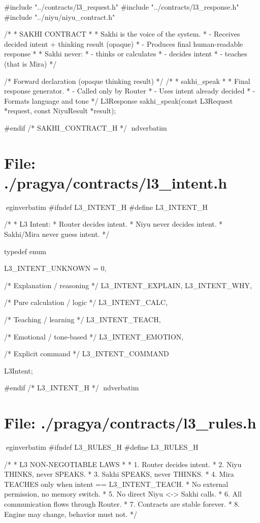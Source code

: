 \documentclass{article}
\begin{document}
#include "../contracts/l3_request.h"
#include "../contracts/l3_response.h"
#include "../niyu/niyu_contract.h"

/*
 * SAKHI CONTRACT
 *
 * Sakhi is the voice of the system.
 * - Receives decided intent + thinking result (opaque)
 * - Produces final human-readable response
 *
 * Sakhi never:
 * - thinks or calculates
 * - decides intent
 * - teaches (that is Mira)
 */

/* Forward declaration (opaque thinking result) */
/*
 * sakhi_speak
 *
 * Final response generator.
 * - Called only by Router
 * - Uses intent already decided
 * - Formats language and tone
 */
L3Response sakhi_speak(const L3Request *request,
                       const NiyuResult *result);

#endif /* SAKHI_CONTRACT_H */
nd{verbatim}
\section*{File: ./pragya/contracts/l3_intent.h}
egin{verbatim}
#ifndef L3_INTENT_H
#define L3_INTENT_H

/* 
 * L3 Intent:
 * Router decides intent.
 * Niyu never decides intent.
 * Sakhi/Mira never guess intent.
 */

typedef enum {
    L3_INTENT_UNKNOWN = 0,

    /* Explanation / reasoning */
    L3_INTENT_EXPLAIN,
    L3_INTENT_WHY,

    /* Pure calculation / logic */
    L3_INTENT_CALC,

    /* Teaching / learning */
    L3_INTENT_TEACH,

    /* Emotional / tone-based */
    L3_INTENT_EMOTION,

    /* Explicit command */
    L3_INTENT_COMMAND

} L3Intent;

#endif /* L3_INTENT_H */
nd{verbatim}
\section*{File: ./pragya/contracts/l3_rules.h}
egin{verbatim}
#ifndef L3_RULES_H
#define L3_RULES_H

/*
 * L3 NON-NEGOTIABLE LAWS
 *
 * 1. Router decides intent.
 * 2. Niyu THINKS, never SPEAKS.
 * 3. Sakhi SPEAKS, never THINKS.
 * 4. Mira TEACHES only when intent == L3_INTENT_TEACH.
 *    No external permission, no memory switch.
 * 5. No direct Niyu <-> Sakhi calls.
 * 6. All communication flows through Router.
 * 7. Contracts are stable forever.
 * 8. Engine may change, behavior must not.
 */
\end{document}
